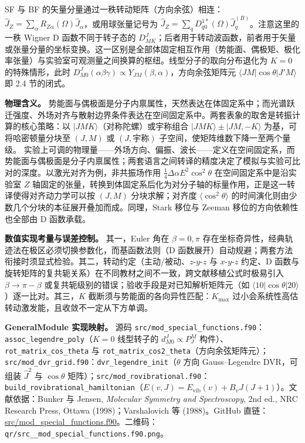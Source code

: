 \documentclass[
]{ctexbook}
\begin{document}
SF 与 BF
的矢量分量通过一秩转动矩阵（方向余弦）相连：\(\hat J_Z=\sum_{\alpha}R_{Z\alpha}(\Omega)\hat J_\alpha\)，或用球张量记号为
\(\hat J_Z=\sum_q D^{1*}_{q0}(\Omega)\hat J_q^{(B)}\)。注意这里的一秩
Wigner D 函数不同于转子态的
\(D^J_{MK}\)；后者用于转动波函数，前者用于矢量或张量分量的坐标变换。这一区别是全部体固定相互作用（势能面、偶极矩、极化率张量）与实验室可观测量之间换算的枢纽。线型分子的取向分布退化为
\(K=0\) 的特殊情形，此时
\(D^{J}_{M0}(\alpha\beta\gamma)\propto Y_{JM}(\beta,\alpha)\)，方向余弦矩阵元
\(\langle J M|\cos\theta|J' M\rangle\) 即 2.4 节的闭式。

\textbf{物理含义。}
势能面与偶极面是分子内禀属性，天然表达在体固定系中；而光谱跃迁强度、外场对齐与散射边界条件表达在空间固定系中。两套表象的取舍是转振计算的核心策略：以
\(|J M K\rangle\)（对称陀螺）或宇称组合
\(|J M K\rangle\pm|J M,-K\rangle\) 为基，可将哈密顿量分块至 \((J,M)\) 或
\((J,\text{宇称})\) 子空间，使矩阵维数下降一至两个量级。
实验上可调的物理量------外场方向、偏振、波长------定义在空间固定系，而势能面与偶极面是分子内禀属性；两套语言之间转译的精度决定了模拟与实验可比对的深度。以激光对齐为例，非共振场作用
\(\tfrac14\Delta\alpha E^{2}\cos^{2}\theta\) 在空间固定系中是沿实验室
\(Z\)
轴固定的张量，转换到体固定系后化为对分子轴的标量作用，正是这一转译使得对齐动力学可以按
\((J,M)\) 分块求解；对齐度 \(\langle\cos^{2}\theta\rangle\)
的时间演化则由少数几个分块的本征展开叠加而成。同理，Stark 移位与 Zeeman
移位的方向依赖性也全部由 D 函数承载。

\textbf{数值实现考量与误差控制。} 其一，Euler 角在 \(\beta=0,\pi\)
存在坐标奇异性，经典轨迹法在极区必须切换参数化，而基函数法则（D
函数展开）自动规避；两套方法衔接时须显式检验。其二，转动约定（主动/被动、\(z\)-\(y\)-\(z\)
与 \(x\)-\(y\)-\(z\) 约定、D
函数与旋转矩阵的复共轭关系）在不同教材之间不一致，跨文献移植公式时极易引入
\(\beta\to\pi-\beta\) 或复共轭级别的错误；验收手段是对已知解析矩阵元（如
\(\langle 10|\cos\theta|20\rangle\)）逐一比对。其三，\(K\)
截断须与势能面的各向异性匹配：\(K_{\max}\)
过小会系统性高估转动激发能，且收敛不一定从下方单调。

\textbf{GeneralModule 实现映射。} 源码
\texttt{src/mod\_special\_functions.f90}：\texttt{assoc\_legendre\_poly}（\(K=0\)
线型转子的 \(d^{J}_{M0}\propto P^{M}_{J}\)
构件）、\texttt{rot\_matrix\_cos\_theta} 与
\texttt{rot\_matrix\_cos2\_theta}（方向余弦矩阵元）；\texttt{src/mod\_dvr\_grid.f90}：\texttt{dvr\_legendre\_init}（\(\theta\)
方向 Gauss--Legendre DVR，可组装 \(\hat{J}^{2}\) 与 \(\cos\theta\)
矩阵）；\texttt{src/mod\_rovibrational.f90}：\texttt{build\_rovibrational\_hamiltonian}（\(E(v,J)=E_{\mathrm{vib}}(v)+B_vJ(J+1)\)）。文献依据：Bunker
与 Jensen, \emph{Molecular Symmetry and Spectroscopy}, 2nd ed., NRC
Research Press, Ottawa (1998)；Varshalovich 等 (1988)。GitHub
直链：\href{https://github.com/l1Ha/QuantumGeneralModule/blob/main/src/mod_special_functions.f90}{src/mod\_special\_functions.f90}。二维码：\texttt{qr/src\_\_mod\_special\_functions.f90.png}。
\end{document}
